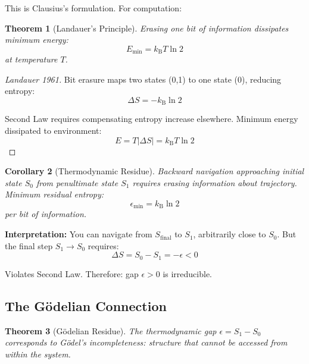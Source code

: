 \documentclass[twocolumn,10pt]{article}
\newtheorem{theorem}{Theorem}[section]
\newtheorem{corollary}[theorem]{Corollary}
\theoremstyle{definition}
\theoremstyle{remark}
\newcommand{\kB}{k_{\text{B}}}
\begin{document}
\noindent This is Clausius's formulation\cite{clausius1865}. For computation:

\begin{theorem}[Landauer's Principle]
\label{thm:landauer}
Erasing one bit of information dissipates minimum energy:
\begin{equation}
E_{\min} = \kB T \ln 2
\end{equation}
at temperature $T$.
\end{theorem}

\begin{proof}[Landauer 1961\cite{landauer1961}]
Bit erasure maps two states (0,1) to one state (0), reducing entropy:
\begin{equation}
\Delta S = -\kB \ln 2
\end{equation}

Second Law requires compensating entropy increase elsewhere. Minimum energy dissipated to environment:
\begin{equation}
E = T |\Delta S| = \kB T \ln 2
\end{equation}
\end{proof}

\begin{corollary}[Thermodynamic Residue]
\label{thm:landauer_residue}
Backward navigation approaching initial state $S_0$ from penultimate state $S_1$ requires erasing information about trajectory. Minimum residual entropy:
\begin{equation}
\epsilon_{\min} = \kB \ln 2
\end{equation}
per bit of information.
\end{corollary}

\vspace{0.2cm}
\noindent\textbf{Interpretation:} You can navigate from $S_{\text{final}}$ to $S_1$, arbitrarily close to $S_0$. But the final step $S_1 \to S_0$ requires:
\begin{equation}
\Delta S = S_0 - S_1 = -\epsilon < 0
\end{equation}

Violates Second Law. Therefore: gap $\epsilon > 0$ is irreducible.

\subsection{The Gödelian Connection}

\begin{theorem}[Gödelian Residue]
\label{thm:godel_connection}
The thermodynamic gap $\epsilon = S_1 - S_0$ corresponds to Gödel's incompleteness: structure that cannot be accessed from within the system.
\end{theorem}
\end{document}
